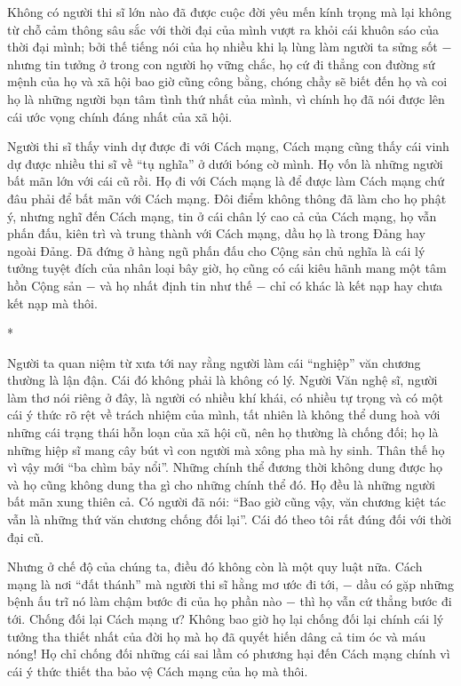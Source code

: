 \documentclass[../main.tex]{subfiles}
\begin{document}
\begin{multicols}{2}
Không có người thi sĩ lớn nào đã được cuộc đời yêu mến kính trọng mà lại không từ chỗ cảm thông sâu sắc với thời đại của mình vượt ra khỏi cái khuôn sáo của thời đại mình; bởi thế tiếng nói của họ nhiều khi lạ lùng làm người ta sửng sốt − nhưng tin tưởng ở trong con người họ vững chắc, họ cứ đi thẳng con đường sứ mệnh của họ và xã hội bao giờ cũng công bằng, chóng chầy sẽ biết đến họ và coi họ là những người bạn tâm tình thứ nhất của mình, vì chính họ đã nói được lên cái ước vọng chính đáng nhất của xã hội. 
 
Người thi sĩ thấy vinh dự được đi với Cách mạng, Cách mạng cũng thấy cái vinh dự được nhiều thi sĩ về “tụ nghĩa” ở dưới bóng cờ mình. Họ vốn là những người bất mãn lớn với cái cũ rồi. Họ đi với Cách mạng là để được làm Cách mạng chứ đâu phải để bất mãn với Cách mạng. Đôi điểm không thông đã làm cho họ phật ý, nhưng nghĩ đến Cách mạng, tin ở cái chân lý cao cả của Cách mạng, họ vẫn phấn đấu, kiên trì và trung thành với Cách mạng, dầu họ là trong Đảng hay ngoài Đảng. Đã đứng ở hàng ngũ phấn đấu cho Cộng sản chủ nghĩa là cái lý tưởng tuyệt đích của nhân loại bây giờ, họ cũng có cái kiêu hãnh mang một tâm hồn Cộng sản − và họ nhất định tin như thế − chỉ có khác là kết nạp hay chưa kết nạp mà thôi. 
 
\begin{center}
*\end{center}
  
Người ta quan niệm từ xưa tới nay rằng người làm cái “nghiệp” văn chương thường là lận đận. Cái đó không phải là không có lý. Người Văn nghệ sĩ, người làm thơ nói riêng ở đây, là người có nhiều khí khái, có nhiều tự trọng và có một cái ý thức rõ rệt về trách nhiệm của mình, tất nhiên là không thể dung hoà với những cái trạng thái hỗn loạn của xã hội cũ, nên họ thường là chống đối; họ là những hiệp sĩ mang cây bút vì con người mà xông pha mà hy sinh. Thân thế họ vì vậy mới “ba chìm bảy nổi”. Những chính thể đương thời không dung được họ và họ cũng không dung tha gì cho những chính thể đó. Họ đều là những người bất mãn xung thiên cả. Có người đã nói: “Bao giờ cũng vậy, văn chương kiệt tác vẫn là những thứ văn chương chống đối lại”. Cái đó theo tôi rất đúng đối với thời đại cũ. 
 
Nhưng ở chế độ của chúng ta, điều đó không còn là một quy luật nữa. Cách mạng là nơi “đất thánh” mà người thi sĩ hằng mơ ước đi tới, − dầu có gặp những bệnh ấu trĩ nó làm chậm bước đi của họ phần nào − thì họ vẫn cứ thẳng bước đi tới. Chống đối lại Cách mạng ư? Không bao giờ họ lại chống đối lại chính cái lý tưởng tha thiết nhất của đời họ mà họ đã quyết hiến dâng cả tim óc và máu nóng! Họ chỉ chống đối những cái sai lầm có phương hại đến Cách mạng chính vì cái ý thức thiết tha bảo vệ Cách mạng của họ mà thôi. 
 

\end{multicols}
\end{document}

